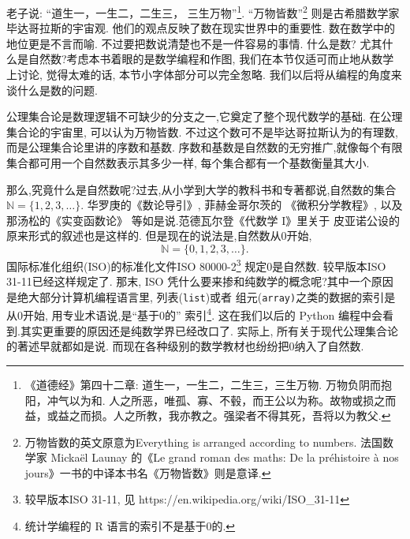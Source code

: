 老子说: “道生一，一生二，二生三，
三生万物”\footnote{《道德经》第四十二章: 道生一，一生二，二生三，三生万物. 万物负阴而抱阳，冲气以为和. 人之所恶，唯孤、寡、不毂，而王公以为称。故物或损之而益，或益之而损。人之所教，我亦教之。强梁者不得其死，吾将以为教父.}.
“万物皆数”\footnote{万物皆数的英文原意为Everything is arranged according to numbers. 
	法国数学家 Mickaël Launay 的《Le grand roman des maths: De la préhistoire à nos jours》一书的中译本书名《万物皆数》则是意译.}
则是古希腊数学家毕达哥拉斯的宇宙观. 他们的观点反映了数在现实世界中的重要性. 数在数学中的地位更是不言而喻.
不过要把数说清楚也不是一件容易的事情. 
什么是数? 尤其什么是自然数?考虑本书着眼的是数学编程和作图,
我们在本节仅适可而止地从数学上讨论, 觉得太难的话,
本节小字体部分可以完全怱略. 我们以后将从编程的角度来谈什么是数的问题. 

公理集合论是数理逻辑不可缺少的分支之一,它奠定了整个现代数学的基础. 在公理集合论的宇宙里, 可以认为万物皆数. 
不过这个数可不是毕达哥拉斯认为的有理数, 而是公理集合论里讲的序数和基数.
序数和基数是自然数的无穷推广,就像每个有限集合都可用一个自然数表示其多少一样,
每个集合都有一个基数衡量其大小.

那么,究竟什么是自然数呢?过去,从小学到大学的教科书和专著都说,自然数的集合$\mathbb{N} = \{1, 2, 3, \dots\}$.
华罗庚的《数论导引》\cite{HuaL}, 菲赫金哥尔茨的
《微积分学教程》\cite{FeiH1}, 以及那汤松的《实变函数论》\cite{Natanco}
等如是说.范德瓦尔登《代数学 I》\cite{derWaerden}里关于
皮亚诺公设的原来形式的叙述也是这样的.
但是现在的说法是,自然数从0开始, 
$$\mathbb{N} = \{0,1, 2, 3, \dots\}.$$
 国际标准化组织(ISO)的标准化文件ISO 80000-2\footnote{较早版本ISO 31-11, 见  https://en.wikipedia.org/wiki/ISO\_31-11}
 规定0是自然数. 较早版本ISO 31-11已经这样规定了.
 那末, ISO 凭什么要来掺和纯数学的概念呢?其中一个原因是绝大部分计算机编程语言里,
 列表(\texttt{list})或者
 组元(\texttt{array)}之类的数据的索引是从0开始,
 用专业术语说,是“基于0的”
 索引\footnote{统计学编程的 R 语言的索引不是基于0的.}.
 这在我们以后的 Python 编程中会看到.其实更重要的原因还是纯数学界已经改口了. 实际上,
 所有关于现代公理集合论的著述早就都如是说\cite{HalmosP}\cite{KelleyJ}\cite{JiangJi}. 
 而现在各种级别的数学教材也纷纷把0纳入了自然数.
 
